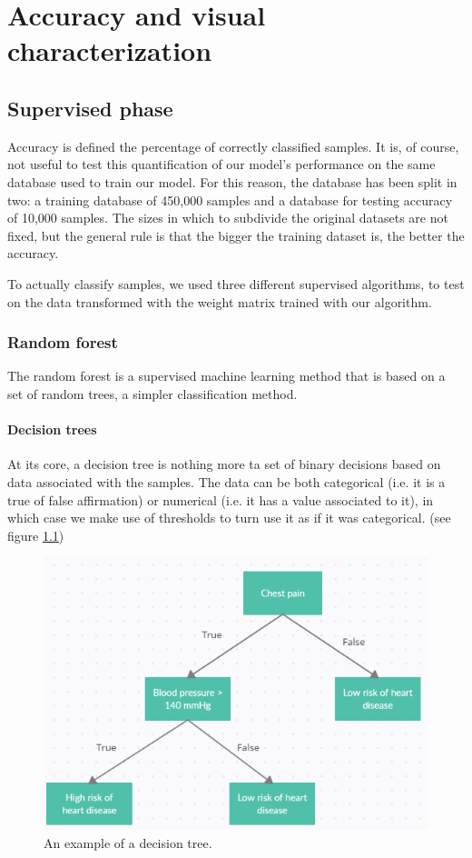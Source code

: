 \documentclass[a4paper]{report}
\begin{document}
\chapter{Accuracy and visual characterization}
\section{Supervised phase}

Accuracy is defined the percentage of correctly classified samples.
It is, of course, not useful to test this quantification of our model's performance on the same database used to train our model.
For this reason, the database has been split in two:
a training database of 450,000 samples and a database for testing accuracy of 10,000 samples.
The sizes in which to subdivide the original datasets are not fixed, but the general rule is that the bigger the training dataset is, the better the accuracy.

To actually classify samples, we used three different supervised algorithms, to test on the data transformed with the weight matrix trained with our algorithm.

\subsection{Random forest}
The random forest is a supervised machine learning method that is based on a set of random trees, a simpler classification method.

\subsubsection{Decision trees}
 At its core, a decision tree is nothing more ta set of binary decisions based on data associated with the samples.
The data can be both categorical (i.e.  it is a true of false affirmation) or numerical (i.e.  it has a value associated to it), in which case we make use of thresholds to turn use it as if it was categorical.
(see figure \ref{chestt})

\begin{figure} [H]
    \centering
    \includegraphics [width=12cm] {o/chestt.png}
    \caption{An example of a decision tree.}
    \label{chestt}
\end{figure}
\end{document}
